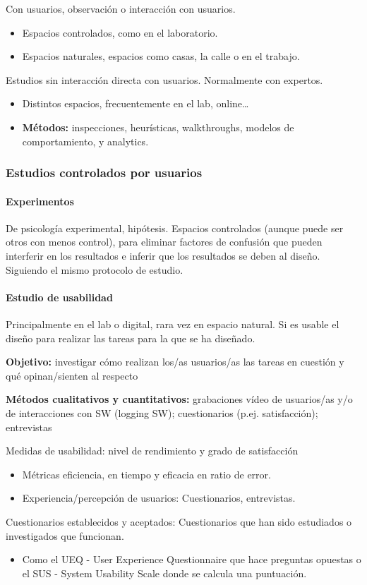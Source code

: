 \documentclass[12pt]{report} %
\begin{document}
Con usuarios, observación o interacción con usuarios.
\begin{itemize}
  \item Espacios controlados, como en el laboratorio.
  \item Espacios naturales, espacios como casas, la calle o en el trabajo.
\end{itemize}

Estudios sin interacción directa con usuarios. Normalmente con expertos.
\begin{itemize}
  \item Distintos espacios, frecuentemente en el lab, online…
  \item \textbf{Métodos:} inspecciones, heurísticas, walkthroughs, modelos de comportamiento, y analytics. 
\end{itemize}

\subsubsection{Estudios controlados por usuarios}
\paragraph{Experimentos}        
 De psicología experimental, hipótesis. Espacios controlados (aunque puede ser otros con menos control), para eliminar factores de confusión que pueden interferir en los resultados e inferir que los resultados se deben al diseño. Siguiendo el mismo protocolo de estudio.

\paragraph{Estudio de usabilidad}        
Principalmente en el lab o digital, rara vez en espacio natural. Si es usable el diseño para realizar las tareas para la que se ha diseñado.

\textbf{Objetivo:} investigar cómo realizan los/as usuarios/as las tareas en cuestión y qué opinan/sienten al respecto

\textbf{Métodos cualitativos y cuantitativos:} grabaciones vídeo de usuarios/as y/o de interacciones con SW (logging SW); cuestionarios (p.ej. satisfacción); entrevistas

Medidas de usabilidad: nivel de rendimiento y grado de satisfacción
\begin{itemize}
  \item Métricas eficiencia, en tiempo y eficacia en ratio de error.
  \item Experiencia/percepción de usuarios: Cuestionarios, entrevistas.
\end{itemize}      
Cuestionarios establecidos y aceptados: Cuestionarios que han sido estudiados o investigados que funcionan.
\begin{itemize}
  \item Como el UEQ - User Experience Questionnaire que hace preguntas opuestas o el SUS - System Usability Scale donde se calcula una puntuación.
\end{itemize}
\end{document}
